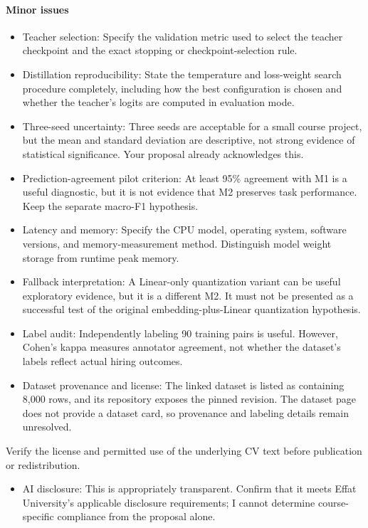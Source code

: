 \paragraph*{Minor issues}
\begin{itemize}
\item Teacher selection: Specify the validation metric used to select the teacher checkpoint and the exact stopping or checkpoint-selection rule.
\item Distillation reproducibility: State the temperature and loss-weight search procedure completely, including how the best configuration is chosen and whether the teacher's logits are computed in evaluation mode.
\item Three-seed uncertainty: Three seeds are acceptable for a small course project, but the mean and standard deviation are descriptive, not strong evidence of statistical significance. Your proposal already acknowledges this.
\item Prediction-agreement pilot criterion: At least 95\% agreement with M1 is a useful diagnostic, but it is not evidence that M2 preserves task performance. Keep the separate macro-F1 hypothesis.
\item Latency and memory: Specify the CPU model, operating system, software versions, and memory-measurement method. Distinguish model weight storage from runtime peak memory.
\item Fallback interpretation: A Linear-only quantization variant can be useful exploratory evidence, but it is a different M2. It must not be presented as a successful test of the original embedding-plus-Linear quantization hypothesis.
\item Label audit: Independently labeling 90 training pairs is useful. However, Cohen's kappa measures annotator agreement, not whether the dataset's labels reflect actual hiring outcomes.
\item Dataset provenance and license: The linked dataset is listed as containing 8,000 rows, and its repository exposes the pinned revision. The dataset page does not provide a dataset card, so provenance and labeling details remain unresolved.
\end{itemize}
Verify the license and permitted use of the underlying CV text before publication or redistribution.

\begin{itemize}
\item AI disclosure: This is appropriately transparent. Confirm that it meets Effat University's applicable disclosure requirements; I cannot determine course-specific compliance from the proposal alone.
\end{itemize}
